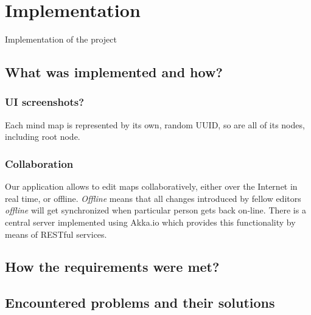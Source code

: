 %
%
%
%
%

\chapter{Implementation}
\label{chap:implementation}

Implementation of the project

\section{What was implemented and how?}
\label{sec:got-implemented}

\subsection{UI screenshots?}
\label{subsec:ui}

Each mind map is represented by its own, random UUID, so are all of its nodes, including root node.

\subsection{Collaboration}
\label{subsec:collaboration2}

Our application allows to edit maps collaboratively, either over the Internet in real time, or offline. {\em Offline} means that all changes introduced by fellow editors {\em offline} will get synchronized when particular person gets back on-line. There is a central server implemented using Akka.io which provides this functionality by means of RESTful services.

\section{How the requirements were met?}
\label{sec:met-requirements}

\section{Encountered problems and their solutions}
\label{sec:impl-problems}
